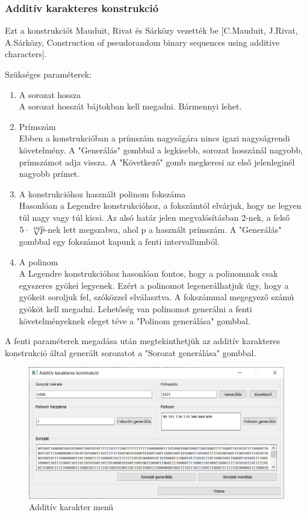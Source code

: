 \documentclass[12pt]{article}
\begin{document}
	\subsubsection{Additív karakteres konstrukció}
	Ezt a konstrukciót Mauduit, Rivat és Sárközy vezették be  [C.Mauduit, J.Rivat, A.Sárközy, Construction of pseudorandom binary sequences using additive characters]. \par
	Szükséges paraméterek:
	\begin{enumerate}
		\bfseries \item A sorozat hossza \\
		\normalfont A sorozat hosszát bájtokban kell megadni. Bármennyi lehet. \\
		\bfseries \item Prímszám \\
		\normalfont Ebben a konstrukcióban a prímszám nagyságára nincs igazi nagyságrendi követelmény. A "Generálás" gombbal a legkisebb, sorozat hosszánál nagyobb, prímszámot adja vissza. A "Következő" gomb megkeresi az első jelenleginél nagyobb prímet.
		\bfseries \item A konstrukcióhoz használt polinom fokszáma \\
		\normalfont Hasonlóan a Legendre konstrukcióhoz, a fokszámtól elvárjuk, hogy ne legyen túl nagy vagy túl kicsi. Az alsó határ jelen megvalósításban 2-nek, a felső $5\cdot\sqrt[\leftroot{-2}\uproot{2}10]{p}$-nek lett megszabva, ahol p a használt prímszám. A "Generálás" gombbal egy fokszámot kapunk a fenti intervallumból.
		\bfseries \item A polinom \\
		\normalfont A Legendre konstrukcióhoz hasonlóan fontos, hogy a polinomnak csak egyszeres gyökei legyenek. Ezért a polinomot legenerálhatjuk úgy, hogy a gyökeit soroljuk fel, szóközzel elválasztva. A fokszámmal megegyező számú gyököt kell megadni. Lehetőség van polinomot generálni a fenti követelményeknek eleget téve a "Polinom generálása" gombbal.
	\end{enumerate}
	A fenti paraméterek megadása után megtekinthetjük az additív karakteres konstrukció által generált sorozatot a "Sorozat generálása" gombbal.
	\begin{figure}[h]
		\centering
		\begin{minipage}{\textwidth} %
			\includegraphics[width=\textwidth]{additivemenu.png}
		\end{minipage}
		\caption{Additív karakter menü}
	\end{figure}
\end{document}

